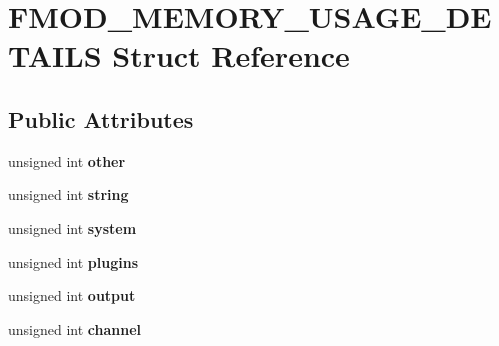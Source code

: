 \hypertarget{struct_f_m_o_d___m_e_m_o_r_y___u_s_a_g_e___d_e_t_a_i_l_s}{}\section{F\+M\+O\+D\+\_\+\+M\+E\+M\+O\+R\+Y\+\_\+\+U\+S\+A\+G\+E\+\_\+\+D\+E\+T\+A\+I\+LS Struct Reference}
\label{struct_f_m_o_d___m_e_m_o_r_y___u_s_a_g_e___d_e_t_a_i_l_s}
\subsection*{Public Attributes}
\begin{DoxyCompactItemize}
\item 
unsigned int {\bfseries other}\hypertarget{struct_f_m_o_d___m_e_m_o_r_y___u_s_a_g_e___d_e_t_a_i_l_s_a300e1bdb5199a52da9f003315c6cb15d}{}\label{struct_f_m_o_d___m_e_m_o_r_y___u_s_a_g_e___d_e_t_a_i_l_s_a300e1bdb5199a52da9f003315c6cb15d}

\item 
unsigned int {\bfseries string}\hypertarget{struct_f_m_o_d___m_e_m_o_r_y___u_s_a_g_e___d_e_t_a_i_l_s_ab8c2dedc98802ead3fdc7cbc22e2f3b4}{}\label{struct_f_m_o_d___m_e_m_o_r_y___u_s_a_g_e___d_e_t_a_i_l_s_ab8c2dedc98802ead3fdc7cbc22e2f3b4}

\item 
unsigned int {\bfseries system}\hypertarget{struct_f_m_o_d___m_e_m_o_r_y___u_s_a_g_e___d_e_t_a_i_l_s_a2d1e357014b5080fc3cfbeaef5c62a13}{}\label{struct_f_m_o_d___m_e_m_o_r_y___u_s_a_g_e___d_e_t_a_i_l_s_a2d1e357014b5080fc3cfbeaef5c62a13}

\item 
unsigned int {\bfseries plugins}\hypertarget{struct_f_m_o_d___m_e_m_o_r_y___u_s_a_g_e___d_e_t_a_i_l_s_a03953fc446eb51222d8db677ade7072f}{}\label{struct_f_m_o_d___m_e_m_o_r_y___u_s_a_g_e___d_e_t_a_i_l_s_a03953fc446eb51222d8db677ade7072f}

\item 
unsigned int {\bfseries output}\hypertarget{struct_f_m_o_d___m_e_m_o_r_y___u_s_a_g_e___d_e_t_a_i_l_s_a9dbd43228c9a6b1410c62ea21594b15a}{}\label{struct_f_m_o_d___m_e_m_o_r_y___u_s_a_g_e___d_e_t_a_i_l_s_a9dbd43228c9a6b1410c62ea21594b15a}

\item 
unsigned int {\bfseries channel}\hypertarget{struct_f_m_o_d___m_e_m_o_r_y___u_s_a_g_e___d_e_t_a_i_l_s_ae3b48702e225301e37957ac229ab0e16}{}\label{struct_f_m_o_d___m_e_m_o_r_y___u_s_a_g_e___d_e_t_a_i_l_s_ae3b48702e225301e37957ac229ab0e16}


\end{DoxyCompactItemize}
